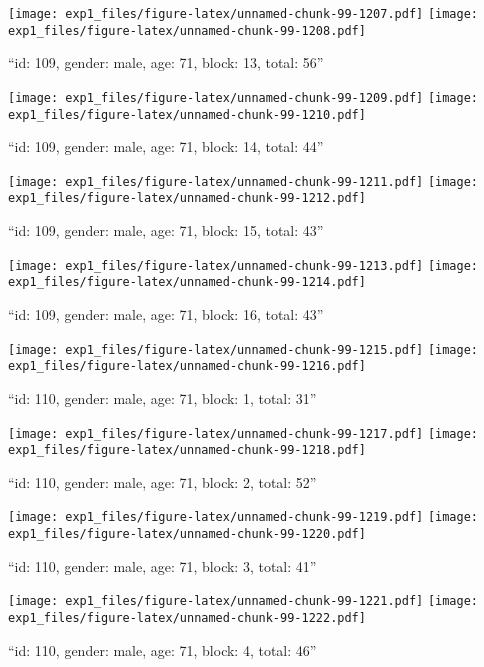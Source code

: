 \documentclass[,]{article}
\begin{document}
\texttt{[image: exp1\_files/figure-latex/unnamed-chunk-99-1207.pdf]}
\texttt{[image: exp1\_files/figure-latex/unnamed-chunk-99-1208.pdf]}

\newpage
[1] 

``id: 109, gender: male, age: 71, block: 13, total: 56''

\texttt{[image: exp1\_files/figure-latex/unnamed-chunk-99-1209.pdf]}
\texttt{[image: exp1\_files/figure-latex/unnamed-chunk-99-1210.pdf]}

\newpage
[1] 

``id: 109, gender: male, age: 71, block: 14, total: 44''

\texttt{[image: exp1\_files/figure-latex/unnamed-chunk-99-1211.pdf]}
\texttt{[image: exp1\_files/figure-latex/unnamed-chunk-99-1212.pdf]}

\newpage
[1] 

``id: 109, gender: male, age: 71, block: 15, total: 43''

\texttt{[image: exp1\_files/figure-latex/unnamed-chunk-99-1213.pdf]}
\texttt{[image: exp1\_files/figure-latex/unnamed-chunk-99-1214.pdf]}

\newpage
[1] 

``id: 109, gender: male, age: 71, block: 16, total: 43''

\texttt{[image: exp1\_files/figure-latex/unnamed-chunk-99-1215.pdf]}
\texttt{[image: exp1\_files/figure-latex/unnamed-chunk-99-1216.pdf]}

\newpage
[1] 

``id: 110, gender: male, age: 71, block: 1, total: 31''

\texttt{[image: exp1\_files/figure-latex/unnamed-chunk-99-1217.pdf]}
\texttt{[image: exp1\_files/figure-latex/unnamed-chunk-99-1218.pdf]}

\newpage
[1] 

``id: 110, gender: male, age: 71, block: 2, total: 52''

\texttt{[image: exp1\_files/figure-latex/unnamed-chunk-99-1219.pdf]}
\texttt{[image: exp1\_files/figure-latex/unnamed-chunk-99-1220.pdf]}

\newpage
[1] 

``id: 110, gender: male, age: 71, block: 3, total: 41''

\texttt{[image: exp1\_files/figure-latex/unnamed-chunk-99-1221.pdf]}
\texttt{[image: exp1\_files/figure-latex/unnamed-chunk-99-1222.pdf]}

\newpage
[1] 

``id: 110, gender: male, age: 71, block: 4, total: 46''
\end{document}
